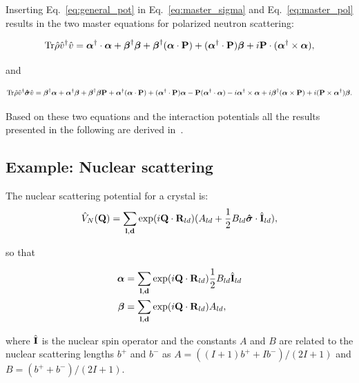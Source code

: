 Inserting Eq.~\ref{eq:general_pot} in Eq.~\ref{eq:master_sigma} and
Eq.~\ref{eq:master_pol} results in the two master equations for
polarized neutron scattering:

\begin{equation}
  \label{eq:general_sigma}
  \text{Tr} \hat\rho \hat{v}^\dagger \hat{v} =
  \boldsymbol{\alpha}^\dagger \cdot \boldsymbol{\alpha} + \boldsymbol{\beta}^\dagger \boldsymbol{\beta}+
  \boldsymbol{\beta}^\dagger (\boldsymbol{\alpha} \cdot \mathbf{P}) +
  (\boldsymbol{\alpha}^\dagger \cdot \mathbf{P}) \boldsymbol{\beta} +
  i\mathbf{P} \cdot (\boldsymbol{\alpha}^\dagger \times \boldsymbol{\alpha}),
\end{equation}

and

\begin{equation}
  \label{eq:general_pol}
  \text{Tr} \hat\rho \hat{v}^\dagger \boldsymbol{\hat\sigma} \hat{v} =
  \boldsymbol{\beta}^\dagger \boldsymbol{\alpha}
  + \boldsymbol{\alpha}^\dagger \boldsymbol{\beta}
  + \boldsymbol{\beta}^\dagger \boldsymbol{\beta} \mathbf{P}
  + \boldsymbol{\alpha}^\dagger (\boldsymbol{\alpha} \cdot \mathbf{P})
  + (\boldsymbol{\alpha}^\dagger \cdot \mathbf{P}) \boldsymbol{\alpha}
  - \mathbf{P} (\boldsymbol{\alpha}^\dagger \cdot \boldsymbol{\alpha})
  - i \boldsymbol{\alpha}^\dagger \times \boldsymbol{\alpha}
  + i \boldsymbol{\beta}^\dagger (\boldsymbol{\alpha} \times \mathbf{P})
  + i (\mathbf{P} \times \boldsymbol{\alpha}^\dagger) \boldsymbol{\beta}.
\end{equation}

Based on these two equations and the interaction potentials all the
results presented in the following are derived in~\cite{lovesey84}.

\subsection{Example: Nuclear scattering}

The nuclear scattering potential for a crystal is:
\begin{equation}
  \label{eq:nuclear_pot}
  \hat{V}_N(\mathbf{Q}) = \sum_{\mathbf{l},\mathbf{d}} \exp(i\mathbf{Q} \cdot \mathbf{R}_{ld})(A_{ld} +
  \frac{1}{2} B_{ld} \boldsymbol{\hat\sigma} \cdot \hat{\mathbf{I}}_{ld}),
\end{equation}

so that

\begin{equation}
  \label{eq:ab_nuclear}
  \begin{aligned}
  \boldsymbol{\alpha} &= 
  \sum_{\mathbf{l},\mathbf{d}} \exp(i\mathbf{Q} \cdot \mathbf{R}_{ld}) \frac{1}{2} B_{ld} \hat{\mathbf{I}}_{ld}  \\
  \boldsymbol{\beta} &= 
  \sum_{\mathbf{l},\mathbf{d}} \exp(i\mathbf{Q} \cdot \mathbf{R}_{ld}) A_{ld},
  \end{aligned}
\end{equation}

where $\hat{\mathbf{I}}$ is the nuclear spin operator and the constants $A$ and $B$
are related to the nuclear scattering lengths $b^+$ and $b^-$ as
$A=((I+1)b^++Ib^-)/(2I+1)$ and $B=(b^++b^-)/(2I+1)$.

